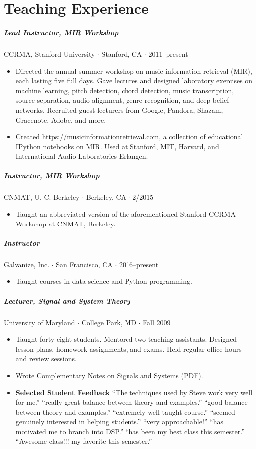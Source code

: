 \documentclass[10pt,letterpaper]{article}
\begin{document}
\section*{Teaching Experience}

\subparagraph{Lead Instructor, MIR Workshop} CCRMA, Stanford University $\cdot$ Stanford, CA $\cdot$ 2011--present
\begin{itemize}
    \item Directed the annual summer workshop on music information retrieval (MIR), each lasting five full days.  Gave lectures and designed laboratory exercises on machine learning, pitch detection, chord detection, music transcription, source separation, audio alignment, genre recognition, and deep belief networks. Recruited guest lecturers from Google, Pandora, Shazam, Gracenote, Adobe, and more.
    \item Created \url{https://musicinformationretrieval.com}, a collection of educational IPython notebooks on MIR. Used at Stanford, MIT, Harvard, and International Audio Laboratories Erlangen.
\end{itemize}

\subparagraph{Instructor, MIR Workshop} CNMAT, U. C. Berkeley $\cdot$ Berkeley, CA $\cdot$ 2/2015
\begin{itemize}
    \item Taught an abbreviated version of the aforementioned Stanford CCRMA Workshop at CNMAT, Berkeley.
\end{itemize}

\subparagraph{Instructor} Galvanize, Inc. $\cdot$ San Francisco, CA $\cdot$ 2016--present
\begin{itemize}
    \item Taught courses in data science and Python programming.
\end{itemize}

\subparagraph{Lecturer, Signal and System Theory} University of Maryland $\cdot$ College Park, MD $\cdot$ Fall 2009
\begin{itemize}
    \item Taught forty-eight students. Mentored two teaching assistants. Designed lesson plans, homework assignments, and exams. Held regular office hours and review sessions.
    \item Wrote \href{http://up.stevetjoa.com/notes322_20091119.pdf}{Complementary Notes on Signals and Systems (PDF)}.
    \item \textbf{Selected Student Feedback}  ``The techniques used by Steve work very well for me.'' ``really great balance between theory and examples.'' ``good balance between theory and examples.'' ``extremely well-taught course.'' ``seemed genuinely interested in helping students.'' ``very approachable!'' ``has motivated me to branch into DSP.'' ``has been my best class this semester.'' ``Awesome class!!! my favorite this semester.''
\end{itemize}
\end{document}
